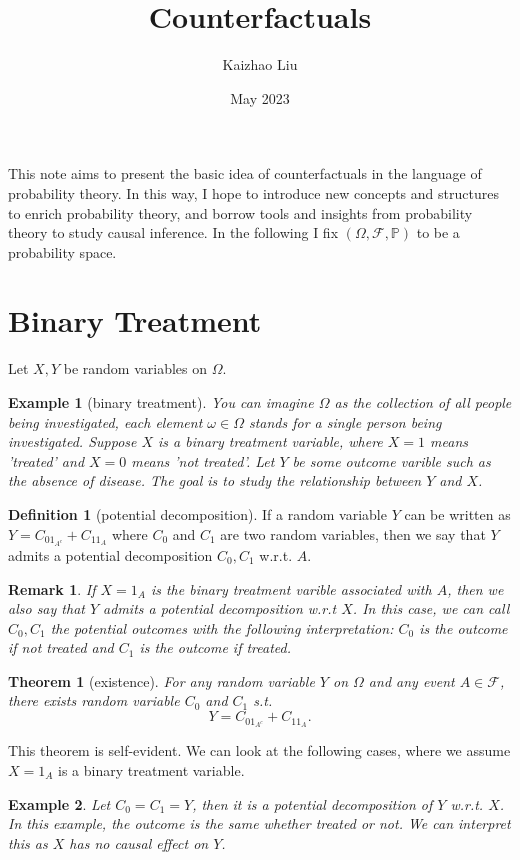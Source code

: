 \documentclass{article}
\title{Counterfactuals}
\author{Kaizhao Liu}
\date{May 2023}
\newtheorem{theorem}{Theorem}[section]
\newtheorem{example}{Example}[section]
\newtheorem*{remark}{Remark}
\theoremstyle{definition}
\newtheorem{definition}{Definition}[section]
\begin{document}
\maketitle
\tableofcontents

This note aims to present the basic idea of counterfactuals in the language of probability theory. 
In this way, I hope to introduce new concepts and structures to enrich probability theory, and borrow tools and insights from probability theory to study causal inference.
In the following I fix $(\Omega,\mathcal{F},\mathbb{P})$ to be a probability space.
\section{Binary Treatment}
 Let $X,Y$ be random variables on $\Omega$.
\begin{example}[binary treatment]\label{binary treatment}
    You can imagine $\Omega$ as the collection of all people being investigated, each element $\omega\in\Omega$ stands for a single person being investigated.
    Suppose $X$ is a binary treatment variable, where $X=1$ means 'treated' and $X=0$ means 'not treated'. Let $Y$ be some outcome varible such as the absence of disease.
    The goal is to study the relationship between $Y$ and $X$. 
\end{example}

\begin{definition}[potential decomposition]
    If a random variable $Y$ can be written as $Y=C_01_{A^c}+C_11_A$ where $C_0$ and $C_1$ are two random variables,
    then we say that $Y$ admits a potential decomposition $C_0,C_1$ w.r.t. $A$.
\end{definition}
\begin{remark}
    If $X=1_A$ is the binary treatment varible associated with $A$, then we also say that $Y$ admits a potential decomposition w.r.t $X$. 
    In this case, we can call $C_0,C_1$ the potential outcomes with the following interpretation: $C_0$ is the outcome if not 
    treated and $C_1$ is the outcome if treated.
\end{remark}

\begin{theorem}[existence]
    For any random variable $Y$ on $\Omega$ and any event $A\in\mathcal{F}$, there exists random variable $C_0$ and $C_1$ s.t. 
    \[Y=C_01_{A^c}+C_11_{A}.\]
\end{theorem}
This theorem is self-evident. We can look at the following cases, where we assume $X=1_A$ is a binary treatment variable. 
\begin{example}
    Let $C_0=C_1=Y$, then it is a potential decomposition of $Y$ w.r.t. $X$. In this example, the outcome is the same whether treated or not.
    We can interpret this as $X$ has no causal effect on $Y$.
\end{example}
\end{document}
